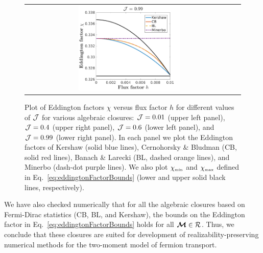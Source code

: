 \begin{figure}[H]
\begin{tabular}{cc}
    \includegraphics[width=0.5\textwidth]{figures/Closures0_99}
  \end{tabular}
   \caption{Plot of Eddington factors $\chi$ versus flux factor $h$ for different values of $\mathcal{J}$ for various algebraic closures: $\mathcal{J}=0.01$ (upper left panel), $\mathcal{J}=0.4$ (upper right panel), $\mathcal{J}=0.6$ (lower left panel), and $\mathcal{J}=0.99$ (lower right panel).  In each panel we plot the Eddington factors of Kershaw (solid blue lines), Cernohorsky \& Bludman (CB, solid red lines), Banach \& Larecki (BL, dashed orange lines), and Minerbo (dash-dot purple lines).  We also plot $\chi_{\mbox{\tiny min}}$ and $\chi_{\mbox{\tiny max}}$ defined in Eq.~\eqref{eq:eddingtonFactorBounds} (lower and upper solid black lines, respectively).}
  \label{fig:EddingtonFactorsWithDifferentClosure}
\end{figure}
We have also checked numerically that for all the algebraic closures based on Fermi-Dirac statistics (CB, BL, and Kershaw), the bounds on the Eddington factor in Eq.~\eqref{eq:eddingtonFactorBounds} holds for all $\boldsymbol{\mathcal{M}}\in\mathcal{R}$.  
Thus, we conclude that these closures are suited for development of realizability-preserving numerical methods for the two-moment model of fermion transport.  

